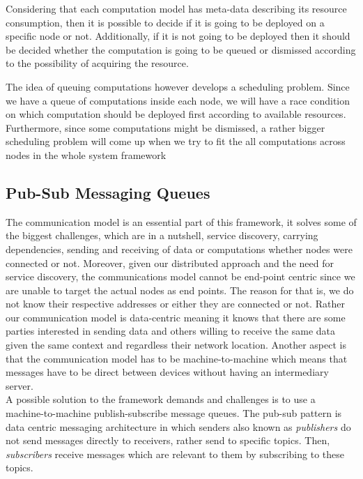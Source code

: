 Considering that each computation model has meta-data describing its resource consumption, then it is possible to decide if it is going to be deployed on a specific node or not. Additionally, if it is not going to be deployed then it should be decided whether the computation is going to be queued or dismissed according to the possibility of acquiring the resource.

The idea of queuing computations however develops a scheduling problem. Since we have a queue of computations inside each node, we will have a race condition on which computation should be deployed first according to available resources. Furthermore, since some computations might be dismissed, a rather bigger scheduling problem will come up when we try to fit the all computations across nodes in the whole system framework 
\newpage




\subsection{Pub-Sub Messaging Queues}

The communication model is an essential part of this framework, it solves some of the biggest challenges, which are in a nutshell, service discovery, carrying dependencies, sending and receiving of data or computations whether nodes were  connected or not. Moreover, given our distributed approach and the need for service discovery, the communications model cannot be  end-point centric since we are unable to target the actual nodes as end points. The reason for that is, we do not know their respective addresses or either they are connected or not. Rather our communication model is data-centric meaning it knows that there are some parties interested in sending data and others willing to receive the same data given the same context and regardless their network location. Another aspect is that the communication model has to be machine-to-machine which means that messages have to be direct between devices without having an intermediary server. \\

A possible solution to the framework demands and challenges is to use a machine-to-machine publish-subscribe message queues. The pub-sub pattern is data centric messaging architecture in which senders also known as \textit{publishers} do not send messages directly to receivers, rather send to specific topics. Then, \textit{subscribers} receive messages which are relevant to them by subscribing to these topics. 

